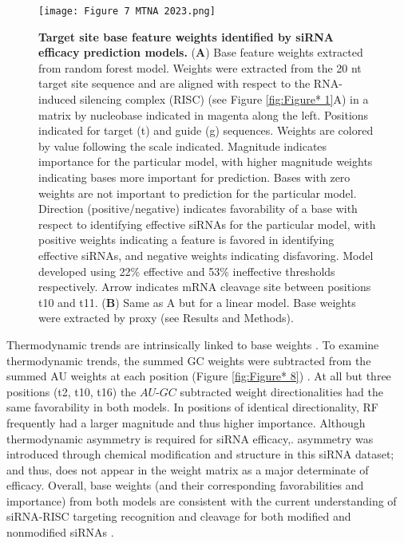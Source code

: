 \documentclass{report}
\begin{document}
\begin{figure}
    \centering
    \texttt{[image: Figure 7 MTNA 2023.png]}
    \caption{\textbf{Target site base feature weights identified by siRNA efficacy prediction models. }(\textbf{A}) Base feature weights extracted from random forest model. Weights were extracted from the 20 nt target site sequence and are aligned with respect to the RNA-induced silencing complex (RISC) (see Figure \ref{fig:Figure* 1}A) in a matrix by nucleobase indicated in magenta along the left. Positions indicated for target (t) and guide (g) sequences. Weights are colored by value following the scale indicated. Magnitude indicates importance for the particular model, with higher magnitude weights indicating bases more important for prediction. Bases with zero weights are not important to prediction for the particular model. Direction (positive/negative) indicates favorability of a base with respect to identifying effective siRNAs for the particular model, with positive weights indicating a feature is favored in identifying effective siRNAs, and negative weights indicating disfavoring. Model developed using 22\% effective and 53\% ineffective thresholds respectively. Arrow indicates mRNA cleavage site between positions t10 and t11. (\textbf{B}) Same as A but for a linear model. Base weights were extracted by proxy (see Results and Methods).
}
    \label{fig:Figure* 7}
\end{figure}

 Thermodynamic trends are intrinsically linked to base weights \cite{reynolds_rational_2004}. To examine thermodynamic trends, the summed GC weights were subtracted from the summed AU weights at each position (Figure \ref{fig:Figure* 8}) \cite{khvorova_functional_2003}. At all but three positions (t2, t10, t16) the $AU$-$GC$ subtracted weight directionalities had the same favorability in both models. In positions of identical directionality, RF frequently had a larger magnitude and thus higher importance. Although thermodynamic asymmetry is required for siRNA efficacy,\cite{khvorova_functional_2003}. asymmetry was introduced through chemical modification and structure in this siRNA dataset; and thus, does not appear in the weight matrix as a major determinate of efficacy. Overall, base weights (and their corresponding favorabilities and importance) from both models are consistent with the current understanding of siRNA-RISC targeting recognition and cleavage for both modified and nonmodified siRNAs \cite{wee_argonaute_2012, becker_high-throughput_2019, deerberg_minimal_2013, jo_human_2015, neumeier_sirna_2021, sheu-gruttadauria_structural_2017}.
\end{document}
